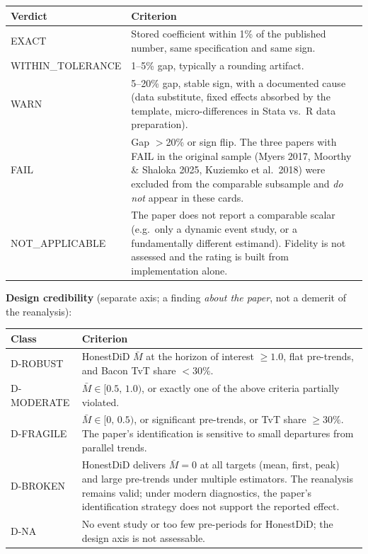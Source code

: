 \begin{table}[H]
\centering
\footnotesize
\begin{tabularx}{\textwidth}{@{}l X@{}}
\toprule
\textbf{Verdict} & \textbf{Criterion} \\
\midrule
EXACT             & Stored coefficient within 1\% of the published number, same specification and same sign. \\
WITHIN\_TOLERANCE & 1--5\% gap, typically a rounding artifact. \\
WARN              & 5--20\% gap, stable sign, with a documented cause (data substitute, fixed effects absorbed by the template, micro-differences in Stata vs.\ R data preparation). \\
FAIL              & Gap $>$20\% or sign flip. The three papers with FAIL in the original sample (Myers 2017, Moorthy \& Shaloka 2025, Kuziemko et al.\ 2018) were excluded from the comparable subsample and \emph{do not} appear in these cards. \\
NOT\_APPLICABLE   & The paper does not report a comparable scalar (e.g.\ only a dynamic event study, or a fundamentally different estimand). Fidelity is not assessed and the rating is built from implementation alone. \\
\bottomrule
\end{tabularx}
\end{table}

\noindent\textbf{Design credibility} (separate axis; a finding \emph{about the paper}, not a demerit of the reanalysis):

\begin{table}[H]
\centering
\footnotesize
\begin{tabularx}{\textwidth}{@{}l X@{}}
\toprule
\textbf{Class} & \textbf{Criterion} \\
\midrule
D-ROBUST   & HonestDiD $\bar{M}$ at the horizon of interest $\geq 1.0$, flat pre-trends, and Bacon TvT share $<30\%$. \\
D-MODERATE & $\bar{M} \in [0.5,\,1.0)$, or exactly one of the above criteria partially violated. \\
D-FRAGILE  & $\bar{M} \in [0,\,0.5)$, or significant pre-trends, or TvT share $\geq 30\%$. The paper's identification is sensitive to small departures from parallel trends. \\
D-BROKEN   & HonestDiD delivers $\bar{M}=0$ at all targets (mean, first, peak) and large pre-trends under multiple estimators. The reanalysis remains valid; under modern diagnostics, the paper's identification strategy does not support the reported effect. \\
D-NA       & No event study or too few pre-periods for HonestDiD; the design axis is not assessable. \\
\bottomrule
\end{tabularx}
\end{table}

